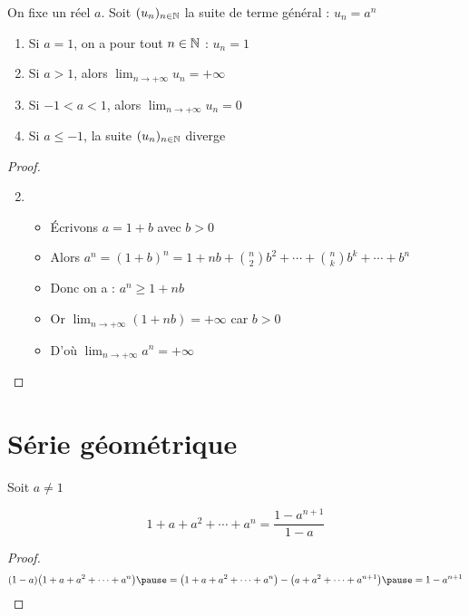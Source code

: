 \begin{frame}
\begin{proposition}
\label{prop:suitegeo}
On fixe un réel $a$. Soit $(u_n)_{n\in \mathbb{N}}$ la suite de terme général : $u_n=a^n$
\begin{enumerate}      
  \setlength{\itemsep}{7pt} 
\pause
  \item Si $a=1$, on a pour tout $n\in \mathbb{N}$ : $u_n=1$
\pause
  \item Si $a>1$, alors $\lim_{n\to +\infty} u_n= +\infty$
\pause  
  \item Si $-1<a<1$, alors $\lim_{n\to +\infty} u_n= 0$
\pause  
  \item Si $a\le-1$, la suite $(u_n)_{n\in \mathbb{N}}$ diverge
\end{enumerate}
\end{proposition}
\pause
\begin{proof}
  \begin{enumerate}
  \setcounter{enumi}{1}
    \item 
    
    \begin{itemize}
      \item Écrivons $a=1+b$ avec $b>0$
\pause      
      \item Alors $a^n=(1+b)^n=1+nb+\binom{n}{2}b^2+\cdots+\binom{n}{k}b^k+\cdots+b^n$
\pause      
      \item Donc on a : $a^n\geq 1+nb$
\pause      
      \item Or $\lim_{n\to +\infty}(1+nb)=+\infty$ car $b>0$
 \pause     
      \item D'où $\lim_{n\to +\infty} a^n=+\infty$ \qedhere
    \end{itemize}
\end{enumerate}
\end{proof}



\end{frame}

\section{Série géométrique}

\begin{frame}
\begin{proposition}
  Soit $a\neq 1$ 
  \vspace*{-3ex}
\end{proposition}
\pause
$$1+a+a^2+\cdots+a^n=\frac{1-a^{n+1}}{1-a}$$
\pause
\begin{proof}
  \[(1-a)\big(1+a+a^2+\cdots+a^n \big) 
  \pause =   \big(1+a+a^2+\cdots+a^n \big) - \big(a+a^2+\cdots+a^{n+1} \big)
  \pause = 1-a^{n+1} \]
\end{proof}
\end{frame}


